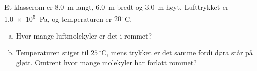 %
Et klasserom er \SI{8.0}{\metre} langt, \SI{6.0}{\metre} bredt og \SI{3.0}{\metre} høyt. Lufttrykket er \SI{1.0e5}{\pascal}, og temperaturen er $20\,^\circ$C.
\begin{enumerate}[a)]
    \item Hvor mange luftmolekyler er det i rommet?
    \item Temperaturen stiger til $25\,^\circ$C, mens trykket er det samme fordi døra står på gløtt. Omtrent hvor mange molekyler har forlatt rommet?
\end{enumerate}
%
